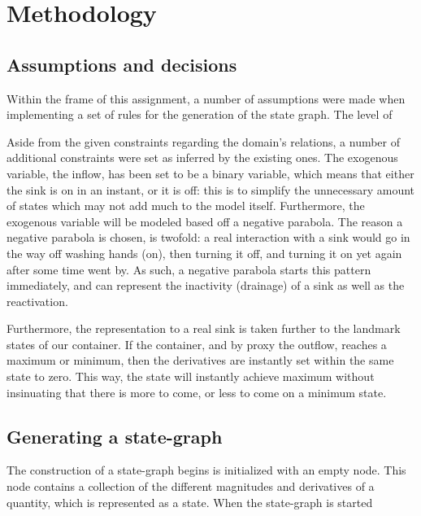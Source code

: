 \section{Methodology}

\subsection{Assumptions and decisions}
Within the frame of this assignment, a number of assumptions were made when
implementing a set of rules for the generation of the state graph. The level of

Aside from the given constraints regarding the domain's relations, a number of
additional constraints were set as inferred by the existing ones. The exogenous
variable, the inflow, has been set to be a binary variable, which means that
either the sink is on in an instant, or it is off: this is to simplify the
unnecessary amount of states which may not add much to the model itself.
Furthermore, the exogenous variable will be modeled based off a negative
parabola. The reason a negative parabola is chosen, is twofold: a real
interaction with a sink would go in the way off washing hands (on), then turning
it off, and turning it on yet again after some time went by. As such, a negative
parabola starts this pattern immediately, and can represent the inactivity (drainage)
of a sink as well as the reactivation.

Furthermore, the representation to a real sink is taken further to the landmark
states of our container. If the container, and by proxy the outflow, reaches a
maximum or minimum, then the derivatives are instantly set within the same state
to zero. This way, the state will instantly achieve maximum without insinuating
that there is more to come, or less to come on a minimum state.

\subsection{Generating a state-graph}
The construction of a state-graph begins is initialized with an empty node. This
node contains a collection of the different magnitudes and derivatives of a
quantity, which is represented as a state. When the state-graph is started